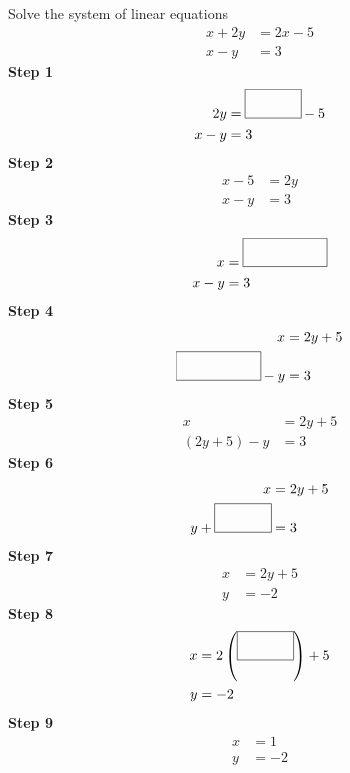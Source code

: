 \documentclass[14pt,letterpaper]{article}
\begin{document}
\begin{exercise}
Solve the system of linear equations
\begin{align*}
x+2y&=2x-5\\
x-y&=3
\end{align*}
\hline
\textbf{Step 1}
\begin{align*}
2y&=\framebox(40,20){}-5\\
x-y&=3\\
\end{align*}
\hline
\textbf{Step 2}
\begin{align*}
x-5&=2y\\
x-y&=3
\end{align*}
\hline
\textbf{Step 3}
\begin{align*}
x&=\framebox(60,20){}\\
x-y&=3
\end{align*}
\hline
\textbf{Step 4}
\begin{align*}
x&=2y+5\\
\framebox(60,20){}-y&=3
\end{align*}
\hline
\textbf{Step 5}
\begin{align*}
x&=2y+5\\
(2y+5)-y&=3
\end{align*}
\hline
\textbf{Step 6}
\begin{align*}
x&=2y+5\\
y+\framebox(40,20){}&=3
\end{align*}
\hline
\textbf{Step 7}
\begin{align*}
x&=2y+5\\
y&=-2
\end{align*}
\hline
\textbf{Step 8}
\begin{align*}
x&=2\left(\framebox(40,20){}\right)+5\\
y&=-2
\end{align*}
\hline
\textbf{Step 9}
\begin{align*}
x&=1\\
y&=-2
\end{align*}
\end{exercise}
\end{document}
